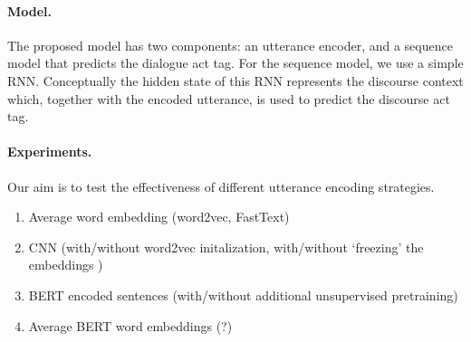 \documentclass[11pt,a4paper,headings=standardclasses]{scrartcl}
\begin{document}
%

\paragraph{Model.}
The proposed model has two components: an utterance encoder, and a sequence model that predicts the dialogue act tag.
For the sequence model, we use a simple RNN.
Conceptually the hidden state of this RNN represents the discourse context which, 
together with the encoded utterance, is used to predict the discourse act tag.

\paragraph{Experiments.}
Our aim is to test the effectiveness of different utterance encoding strategies. 
\begin{enumerate}
  \item Average word embedding (word2vec, FastText)
  \item CNN (with/without word2vec initalization, with/without `freezing' the embeddings )
  \item BERT encoded sentences (with/without additional unsupervised pretraining)
  \item Average BERT word embeddings (?)
  \end{enumerate}
\end{document}
